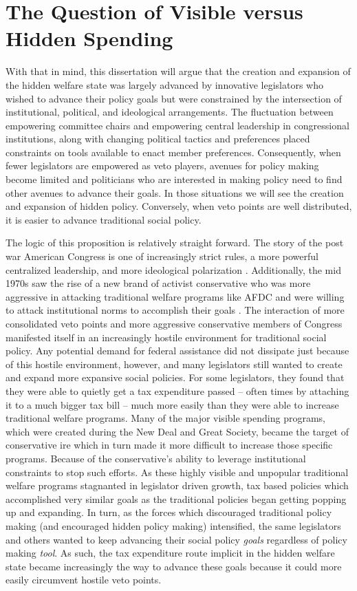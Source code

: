 \documentclass[12pt]{article}
\begin{document}
\section{The Question of Visible versus Hidden Spending}
With that in mind, this dissertation will argue that the creation and expansion of the hidden welfare state was largely advanced by innovative legislators who wished to advance their policy goals but were constrained by the intersection of institutional, political, and ideological arrangements. The fluctuation between empowering committee chairs and empowering central leadership in congressional institutions, along with changing political tactics and preferences placed constraints on tools available to enact member preferences. Consequently, when fewer legislators are empowered as veto players, avenues for policy making become limited and politicians who are interested in making policy need to find other avenues to advance their goals. In those situations we will see the creation and expansion of hidden policy. Conversely, when veto points are well distributed, it is easier to advance traditional social policy.

The logic of this proposition is relatively straight forward. The story of the post war American Congress is one of increasingly strict rules, a more powerful centralized leadership, and more ideological polarization \citep{rohde1991, binder2003}. Additionally, the mid 1970s saw the rise of a new brand of activist conservative who was more aggressive in attacking traditional welfare programs like AFDC and were willing to attack institutional norms to accomplish their goals \citep{hacker2007, theriault2013}. The interaction of more consolidated veto points and more aggressive conservative members of Congress manifested itself in an increasingly hostile environment for traditional social policy. Any potential demand for federal assistance did not dissipate just because of this hostile environment, however, and many legislators still wanted to create and expand more expansive social policies. For some legislators, they found that they were able to quietly get a tax expenditure passed -- often times by attaching it to a much bigger tax bill -- much more easily than they were able to increase traditional welfare programs. Many of the major visible spending programs, which were created during the New Deal and Great Society, became the target of conservative ire which in turn made it more difficult to increase those specific programs. Because of the conservative's ability to leverage institutional constraints to stop such efforts. As these highly visible and unpopular traditional welfare programs stagnanted in legislator driven growth, tax based policies which accomplished very similar goals as the traditional policies began getting popping up and expanding. In turn, as the forces which discouraged traditional policy making (and encouraged hidden policy making) intensified, the same legislators and others wanted to keep advancing their social policy \emph{goals} regardless of policy making \emph{tool}. As such, the tax expenditure route implicit in the hidden welfare state became increasingly the way to advance these goals because it could more easily circumvent hostile veto points.
\end{document}
